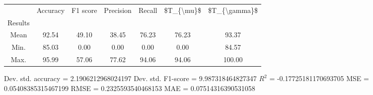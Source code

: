 \begin{tabular}{|c|c|c|c|c|c|c|}
\toprule
{} &  Accuracy &  F1 score &  Precision &  Recall &  \$T\_\{\textbackslash mu\}\$ &  \$T\_\{\textbackslash gamma\}\$ \\
Results &           &           &            &         &            &               \\
\hline
Mean    &     92.54 &     49.10 &      38.45 &   76.23 &      76.23 &         93.37 \\
Min.    &     85.03 &      0.00 &       0.00 &    0.00 &       0.00 &         84.57 \\
Max.    &     95.99 &     57.06 &      77.62 &   94.06 &      94.06 &        100.00 \\
\bottomrule
\end{tabular}

 Dev. std. accuracy = 2.1906212968024197
 Dev. std. F1-score = 9.987318464827347
 $R^2$ = -0.17725181170693705
 MSE = 0.05408385315467199
 RMSE = 0.2325593540468153
 MAE = 0.07514316390531058